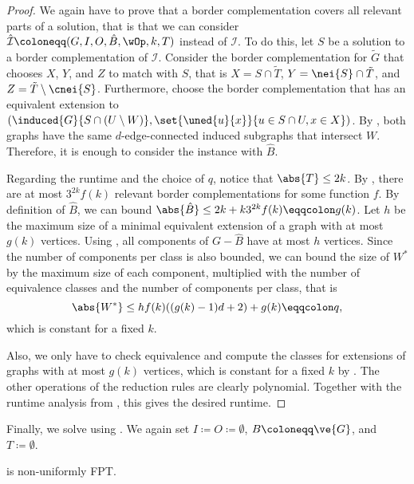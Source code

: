 \begin{lemma}
\begin{lemma}
\begin{lemma}
\begin{lemma}
\begin{lemma}
\begin{theorem}
\begin{reduction*}
\begin{lemma}
\begin{reduction*}
\begin{reduction*}
\begin{theorem}
\begin{proof}
  We again have to prove that a border complementation covers all relevant parts of a solution, that is that we can consider $\mathcal{\hat{I}} \coloneqq (G,I,O,\hat{B},\wOp,k,T)$ instead of $\mathcal{I}$. To do this, let $S$ be a solution to a border complementation of $\mathcal{I}$. Consider the border complementation for $\tilde{G}$ that chooses $X$, $Y$, and $Z$ to match with $S$, that is $X = S \cap \tilde{T}$, $Y = \nei{S} \cap \tilde{T}$, and $Z = \tilde{T} \setminus \cnei{S}$. Furthermore, choose the border complementation that has an equivalent extension to $(\induced{G}{S \cap (U \setminus W)}, \set{\uned{u}{x}}{u \in S \cap U, x \in X})$. By , both graphs have the same $d$-edge-connected induced subgraphs that intersect $W$. Therefore, it is enough to consider the instance with $\hat{B}$.

  Regarding the runtime and the choice of $q$, notice that $\abs{T} \le 2k$. By , there are at most $3^{2k}f(k)$ relevant border complementations for some function $f$. By definition of $\hat{B}$, we can bound $\abs{\hat{B}} \le 2k + k 3^{2k}f(k) \eqqcolon g(k)$. Let $h$ be the maximum size of a minimal equivalent extension of a graph with at most $g(k)$ vertices. Using , all components of $G-\hat{B}$ have at most $h$ vertices. Since the number of components per class is also bounded, we can bound the size of $W^*$ by the maximum size of each component, multiplied with the number of equivalence classes and the number of components per class, that is \[\abs{W^*} \le hf(k)((g(k)-1)d + 2) + g(k) \eqqcolon q,\] which is constant for a fixed $k$.

  Also, we only have to check equivalence and compute the classes for extensions of graphs with at most $g(k)$ vertices, which is constant for a fixed $k$ by . The other operations of the reduction rules are clearly polynomial. Together with the runtime analysis from , this gives the desired runtime.
\end{proof}
\fi

Finally, we solve \prob{} using \probborder{}. We again set $I \coloneqq O \coloneqq \emptyset$, $B \coloneqq \ve{G}$, and $T \coloneqq \emptyset$.

\begin{theorem}\label{cor:d_edge_fpt}
  \prob{} is non-uniformly FPT.
\end{theorem}


\end{theorem}
\end{reduction*}
\end{reduction*}
\end{lemma}
\end{reduction*}
\end{theorem}
\end{lemma}
\end{lemma}
\end{lemma}
\end{lemma}
\end{lemma}
